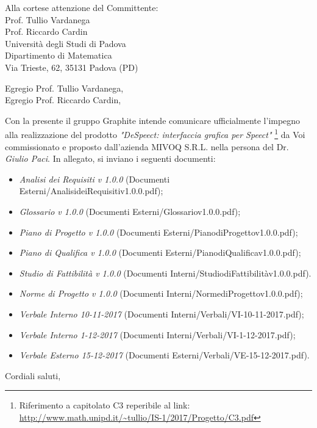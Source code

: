 \documentclass[]{letter}
\begin{document}
\begin{letter}{
		Alla cortese attenzione del Committente: \\
		Prof. Tullio Vardanega \\
		Prof. Riccardo Cardin \\
		Università degli Studi di Padova \\
		Dipartimento di Matematica \\ 
		Via Trieste, 62, 35131 Padova (PD)
}

\opening{Egregio Prof. Tullio Vardanega, \\ Egregio Prof. Riccardo Cardin,}

Con la presente il gruppo Graphite intende comunicare ufficialmente l’impegno alla realizzazione del prodotto  \textit{"DeSpeect: interfaccia grafica per Speect"} \footnote{Riferimento a capitolato C3 reperibile al link: \url{http://www.math.unipd.it/~tullio/IS-1/2017/Progetto/C3.pdf}} da Voi commissionato e proposto dall'azienda MIVOQ S.R.L. nella persona del Dr. \textit{Giulio Paci}.  In  allegato,  si inviano i seguenti documenti:

\begin{itemize}
	\item \textit{Analisi dei Requisiti v 1.0.0} (Documenti Esterni/AnalisideiRequisitiv1.0.0.pdf);
	\item \textit{Glossario v 1.0.0} (Documenti Esterni/Glossariov1.0.0.pdf);
	\item \textit{Piano di Progetto v 1.0.0} (Documenti Esterni/PianodiProgettov1.0.0.pdf);
	\item \textit{Piano di Qualifica v 1.0.0} (Documenti Esterni/PianodiQualificav1.0.0.pdf);
	\item \textit{Studio di Fattibilità v 1.0.0} (Documenti Interni/StudiodiFattibilitàv1.0.0.pdf).
	\item \textit{Norme di Progetto v 1.0.0} (Documenti Interni/NormediProgettov1.0.0.pdf);
	\item \textit{Verbale Interno 10-11-2017} (Documenti Interni/Verbali/VI-10-11-2017.pdf);
	\item \textit{Verbale Interno 1-12-2017} (Documenti Interni/Verbali/VI-1-12-2017.pdf);
	\item \textit{Verbale Esterno 15-12-2017} (Documenti Esterni/Verbali/VE-15-12-2017.pdf).
\end{itemize}

\signature{Responsabile di Progetto \\ Graphite}

\closing{Cordiali saluti,}


\end{letter}
\end{document}
